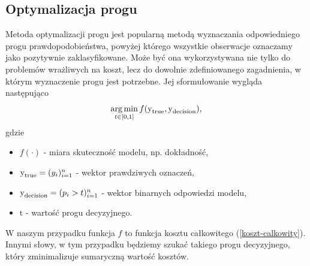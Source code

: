 \documentclass[inzynierska]{pwr_wmat_praca_dyplomowa}
\theoremstyle{plain}
\numberwithin{theorem}{chapter}
\theoremstyle{definition}
\numberwithin{theorem}{chapter}
\DeclareMathOperator*{\argmin}{arg\,min}
\begin{document}
\subsection{Optymalizacja progu}
Metoda optymalizacji progu jest popularną metodą wyznaczania odpowiedniego progu prawdopodobieństwa, powyżej którego wszystkie obserwacje oznaczamy jako pozytywnie zaklasyfikowane. Może być ona wykorzystywana nie tylko do problemów wrażliwych na koszt, lecz do dowolnie zdefiniowanego zagadnienia, w którym wyznaczenie progu jest potrzebne. Jej sformułowanie wygląda następująco
$$ \argmin_{t \in [0,1]} f(\ylab{y}{true}, \ylab{y}{decision}) \text{,} $$
gdzie 
\begin{itemize}
	\item $ f(\cdot) $ - miara skuteczność modelu, np. dokładność,
	\item $ \text{y}_{\text{true}} = (y_i)_{i=1}^n $ - wektor prawdziwych oznaczeń,
	\item $ \text{y}_{\text{decision}} = (p_i > t)_{i=1}^n $ - wektor binarnych odpowiedzi modelu,
	\item $ \text{t} $ - wartość progu decyzyjnego.
\end{itemize}{}
W naszym przypadku funkcja $f$ to funkcja kosztu całkowitego (\ref{koszt-calkowity}). Innymi słowy, w tym przypadku będziemy szukać takiego progu decyzyjnego, który zminimalizuje sumaryczną wartość kosztów.

\end{document}
